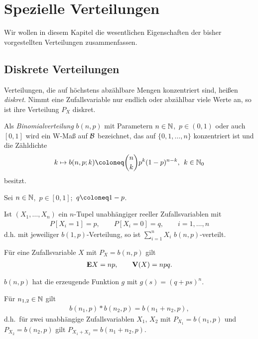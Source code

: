 \chapter{Spezielle Verteilungen}
\label{chap:7}

Wir wollen in diesem Kapitel die wesentlichen Eigenschaften der bisher
vorgestellten Verteilungen zusammenfassen.

\section{Diskrete Verteilungen}

Verteilungen, die auf höchstens abzählbare Mengen konzentriert sind, heißen
\emph{diskret}. Nimmt eine Zufallsvariable nur endlich oder
abzählbar viele Werte an, so ist ihre Verteilung $P_X$ diskret.

\begin{defn}
\label{defn:7.1}
Als \emph{Binomialverteilung} $b(n,p)$ mit Parametern $n\in
\mathbb{N}$, $\, p\in (0,1)$ oder auch $[0,1]$ wird ein W-Maß auf ${\mathcal{B}}$
bezeichnet, das auf $\{0,1,\ldots,n\}$ konzentriert ist und die Zähldichte
\begin{align*}
k\mapsto b(n,p;k)\defl {n\choose k} p^ {k}(1-p)^ {n-k}, \;\, k\in \N_{0}
\end{align*}
besitzt.\fishhere
\end{defn}

\begin{prop}
\label{prop:7.1}
Sei $n\in \mathbb{N}$, $\, p\in [0,1]$; $\, q\defl 1-p$.\\[-7mm]
\begin{propenum}
\item
Ist $(X_{1}, \ldots , X_{n})$ ein $n$-Tupel unabhängiger reeller Zufallsvariablen mit
\begin{align*}
P[X_{i} =1] = p,\qquad P[X_{i}=0] = q,\qquad i=1,\ldots,n
\end{align*}
d.h. mit jeweiliger $b(1,p)$-Verteilung, so ist $\sum^{n}_{i=1} X_{i}$ \; $b(n,p)$-verteilt.
\item Für eine Zufallsvariable $X$ mit $P_{X}= b(n,p)$ gilt
\begin{align*}
\textbf{E} X=np,\qquad\textbf{V}(X) =npq.
\end{align*} 
\item
$b(n,p)$ hat die erzeugende Funktion $g$ mit $g(s) = (q+ps)^ {n}$.
\item
Für $n_{1,2} \in \mathbb{N}$ gilt
\begin{align*}
b(n_{1},p) \ast b(n_{2},p) = b (n_{1}+n_{2},p),
\end{align*}
d.h.\ für zwei unabhängige Zufallsvariablen $X_{1}$, $X_{2}$ mit
$P_{X_{1}}=b(n_{1},p)$ und $P_{X_{2}}= b(n_{2},p)$ gilt
$ P_{X_{1}+X_{2}}=b(n_{1}+n_{2},p)$.\fishhere
\end{propenum}
\end{prop}

